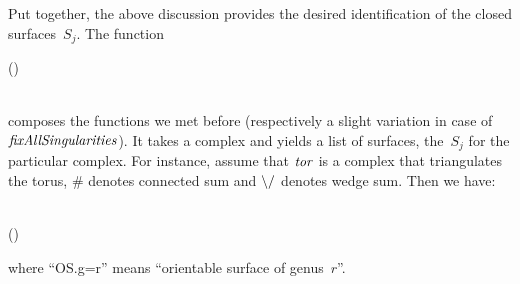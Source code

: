 Put together, the above discussion provides the desired identification of the
closed surfaces~$S_j$. The function
\begin{hscode}\SaveRestoreHook
{}%
%
%
\>[B]{}\mathbin{::}(\;)\Rightarrow {}\;\<[E]%
\\
\>[B]{}\mathrel{=}{}\<[E]%
\\
\>[B]{}\<[5]%
\>[5]{}\;\mathbin{\circ}\mathbin{\circ}\<[E]%
\ColumnHook
\end{hscode}\resethooks
composes the functions we met before (respectively a slight variation in case
of \ensuremath{\Varid{fixAllSingularities}}). It takes a complex and yields a list of surfaces,
the~$S_j$ for the particular complex. For instance, assume that \ensuremath{\Varid{tor}} is a
complex that triangulates the torus, \ensuremath{\mathbin{\#}} denotes connected sum and \ensuremath{\mathbin{\char92 /}}
denotes wedge sum. Then we have:\begin{hscode}\SaveRestoreHook
{}%
%
%
%
\>[3]{}\;\<[38]%
\>[38]{}\qquad\mbox{\onelinecomment   [OS.g=1]}{}\<[E]%
\\
\>[3]{}\mathbin{\$}(\mathbin{\#})\<[38]%
\>[38]{}\qquad\mbox{\onelinecomment   [OS.g=2,OS.g=1]}{}\<[E]%
\ColumnHook
\end{hscode}\resethooks
where \enquote{OS.g=r} means \enquote{orientable surface of genus~$r$}.


